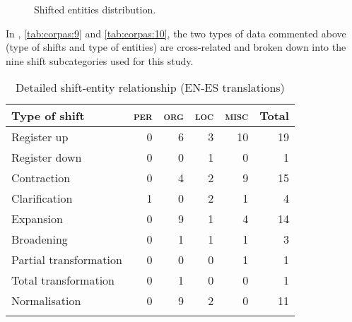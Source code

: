 \documentclass[output=paper]{langscibook}
\begin{document}
\begin{figure}


\caption{
Shifted entities distribution.
}
\label{fig:corpas:7}
\end{figure}

In , \ref{tab:corpas:9} and \ref{tab:corpas:10}, the two types of data commented above (type of shifts and type of entities) are cross-related and broken down into the nine shift subcategories used for this study.

\begin{table}
\begin{tabularx}{\textwidth}{Qrrrrr}

\lsptoprule

{\bfseries Type of shift} & {\bfseries \textsc{per}} & {\bfseries \textsc{org}} & {\bfseries \textsc{loc}} & {\bfseries \textsc{misc}} & {\bfseries Total}\\
\midrule
Register up & 0 & 6 & 3 & 10 & 19\\
Register down & 0 & 0 & 1 & 0 & 1\\
Contraction & 0 & 4 & 2 & 9 & 15\\
Clarification & 1 & 0 & 2 & 1 & 4\\
Expansion & 0 & 9 & 1 & 4 & 14\\
Broadening & 0 & 1 & 1 & 1 & 3\\
Partial transformation & 0 & 0 & 0 & 1 & 1\\
Total transformation & 0 & 1 & 0 & 0 & 1\\
Normalisation & 0 & 9 & 2 & 0 & 11\\
\lspbottomrule
\end{tabularx}
\caption{
Detailed shift-entity relationship (EN-ES translations)
}
\label{tab:corpas:8}
\end{table}
\end{document}
